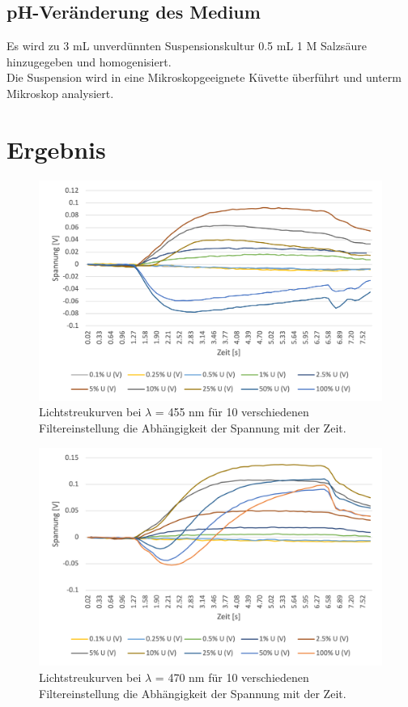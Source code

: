 \documentclass[10pt,a4paper]{article}
\begin{document}
	\subsection{pH-Veränderung des Medium}
	Es wird zu 3 mL unverdünnten Suspensionskultur 0.5 mL 1 M Salzsäure hinzugegeben und homogenisiert.\\
	Die Suspension wird in eine Mikroskopgeeignete Küvette überführt und unterm Mikroskop analysiert.

	\section{Ergebnis}
		\begin{figure}[H]
		\centering
		\includegraphics[scale=1]{Picture 1.png}
		\caption{Lichtstreukurven bei $\lambda$ = 455 nm für 10 verschiedenen Filtereinstellung die Abhängigkeit der Spannung mit der Zeit. }
		\label{fig:455nm}
	\end{figure}
	
		\begin{figure}[H]
		\centering
		\includegraphics[scale=1]{Picture 2.png}
		\caption{Lichtstreukurven bei $\lambda$ = 470 nm für 10 verschiedenen Filtereinstellung die Abhängigkeit der Spannung mit der Zeit. }
		\label{fig:470nm}
	\end{figure}
\end{document}
